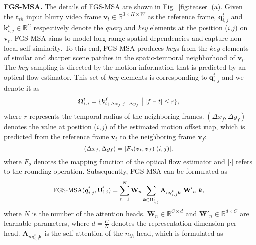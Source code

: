 \documentclass{article}
\begin{document}
	\noindent\textbf{FGS-MSA.} The details of FGS-MSA are shown in Fig.~\ref{fig:teaser} (a). Given the $\boldsymbol{t}_{th}$ input blurry video frame $\boldsymbol{v}_t \in \mathbb{R}^{3\times H \times W}$ as the reference frame, $\boldsymbol{q}_{i,j}^t$ and $\boldsymbol{k}_{i,j}^t \in \mathbb{R}^{C}$  respectively denote the \emph{query} and \emph{key} elements at the position ($i$,$j$) on $\boldsymbol{v}_t$. FGS-MSA aims to model long-range spatial dependencies and capture non-local self-similarity. To this end, FGS-MSA produces $key$s from the $key$ elements of similar and sharper scene patches in the spatio-temporal neighborhood of $\boldsymbol{v}_t$. The $key$ sampling is directed by the motion information that is predicted by an optical flow estimator. This set of $key$ elements is corresponding to $\boldsymbol{q}_{i,j}^t$ and we denote it as 
	\begin{equation}
	\small
	\mathbf{\Omega}_{i,j}^t = \{\boldsymbol{k}^f_{i+{\Delta x_f},j+{\Delta y_f}}\bigm||f-t| \leq r\},
	\label{eq:Omega_k}
	\end{equation}
	where $r$ represents the temporal radius of the neighboring frames. $({\Delta x_f}, {\Delta y_f})$ denotes the value at position ($i, j$) of the estimated motion offset map, which is predicted from the reference frame $\boldsymbol{v}_t$ to the neighboring frame $\boldsymbol{v}_f$:
	\begin{equation}
	\small
	({\Delta x_f}, {\Delta y_f}) = [F_o(\boldsymbol{v}_t, \boldsymbol{v}_f)~(i,j)],
	\label{eq:flow}
	\end{equation}
	where $F_o$ denotes the mapping function of the optical flow estimator and [$\cdot$] refers to the rounding operation. Subsequently, FGS-MSA can be formulated as
	\vspace{-0.5mm}
	\begin{equation}
	\small
	\text{FGS-MSA}(\boldsymbol{q}_{i,j}^t,\mathbf{\Omega}_{i,j}^t) = \sum_{n=1}^{N} \mathbf{W}_n  \sum_{\boldsymbol{k}\in\mathbf{\Omega}_{i,j}^t} \mathbf{A}_{n\boldsymbol{q}_{i,j}^t\boldsymbol{k}}~ \mathbf{W'}_n ~  \boldsymbol{k},
	\label{eq:OFGMSA}
	\end{equation}
	where $N$ is the number of the attention heads. $\mathbf{W}_n \in \mathbb{R}^{C\times d}$ and $\mathbf{W'}_n \in \mathbb{R}^{d\times C}$ are learnable parameters, where $d = \frac{C}{N}$ denotes the representation dimension per head.  $\mathbf{A}_{n\boldsymbol{q}_{i,j}^t\boldsymbol{k}}$ is the self-attention of the $n_{th}$ head, which is formulated as
	\vspace{-0.5mm}
\end{document}
